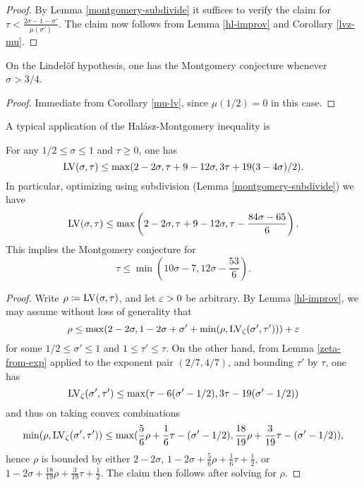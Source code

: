 \begin{proof} By Lemma \ref{montgomery-subdivide} it suffices to verify the claim for $\tau < \frac{2\sigma-1-\sigma'}{\mu(\sigma')}$.  The claim now follows from Lemma \ref{hl-improv} and Corollary \ref{lvz-mu}.
\end{proof}

\begin{theorem}\label{htlv}\cite[Theorem 1]{halasz_distribution_1969} On the Lindel\"of hypothesis, one has the Montgomery conjecture whenever $\sigma > 3/4$.
\end{theorem}

\begin{proof}  Immediate from Corollary \ref{mu-lv}, since $\mu(1/2)=0$ in this case.
\end{proof}

A typical application of the Hal\'asz-Montgomery inequality is

\begin{lemma}\label{ivic-lvt}\cite[(11.40)]{ivic}  For any $1/2 \leq \sigma \leq 1$ and $\tau \geq 0$, one has
    $$ \mathrm{LV}(\sigma,\tau) \leq \max( 2-2\sigma, \tau + 9-12\sigma, 3\tau + 19(3-4\sigma)/2).$$
In particular, optimizing using subdivision (Lemma \ref{montgomery-subdivide}) we have
$$ \mathrm{LV}(\sigma,\tau) \leq \max\left( 2-2\sigma, \tau + 9-12\sigma, \tau - \frac{84\sigma-65}{6}\right).$$
This implies the Montgomery conjecture for
$$ \tau \leq \min( 10\sigma-7, 12 \sigma - \frac{53}{6}).$$
\end{lemma}

\begin{proof}  Write $\rho \coloneqq \mathrm{LV}(\sigma,\tau)$, and let $\varepsilon>0$ be arbitrary. By Lemma \ref{hl-improv}, we may assume without loss of generality that
$$ \rho \leq \max( 2-2\sigma, 1-2\sigma + \sigma' + \min( \rho, \mathrm{LV}_\zeta(\sigma',\tau')) ) + \varepsilon$$
for some $1/2 \leq \sigma' \leq 1$ and $1 \leq \tau' \leq \tau$.  On the other hand, from Lemma \ref{zeta-from-exp} applied to the exponent pair $(2/7,4/7)$, and bounding $\tau'$ by $\tau$, one has
$$ \mathrm{LV}_\zeta(\sigma',\tau') \leq \max( \tau-6(\sigma'-1/2), 3\tau - 19(\sigma'-1/2))$$
and thus on taking convex combinations
$$ \min(\rho,\mathrm{LV}_\zeta(\sigma',\tau')) \leq \max( \frac{5}{6}\rho + \frac{1}{6} \tau - (\sigma'-1/2), \frac{18}{19} \rho + \frac{3}{19} \tau - (\sigma'-1/2) ),$$
hence $\rho$ is bounded by either $2 - 2 \sigma$, $1 - 2\sigma + \frac{5}{6}\rho + \frac{1}{6} \tau + \frac{1}{2}$, or $1-2\sigma + \frac{18}{19} \rho + \frac{3}{19} \tau + \frac{1}{2}$.  The claim then follows after solving for $\rho$.
\end{proof}
